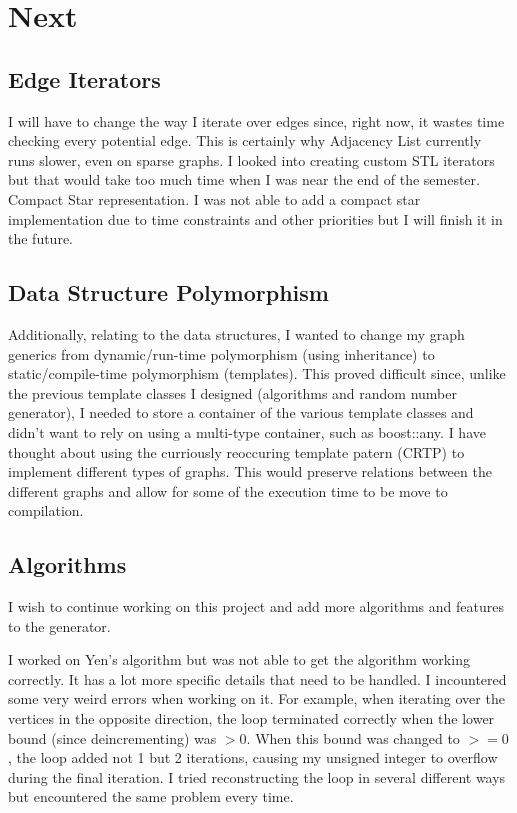 \documentclass{article}
\begin{document}
\section{Next}
\subsection{Edge Iterators}
I will have to change the way I iterate over edges since, right now, it wastes time checking every potential edge. This is certainly why Adjacency List currently runs slower, even on sparse graphs. I looked into creating custom STL iterators but that would take too much time when I was near the end of the semester. Compact Star representation. I was not able to add a compact star implementation due to time constraints and other priorities but I will finish it in the future. 

\subsection{Data Structure Polymorphism}
Additionally, relating to the data structures, I wanted to change my graph generics from dynamic/run-time polymorphism (using inheritance) to static/compile-time polymorphism (templates). This proved difficult since, unlike the previous template classes I designed (algorithms and random number generator), I needed to store a container of the various template classes and didn't want to rely on using a multi-type container, such as boost::any. 
I have thought about using the curriously reoccuring template patern (CRTP) to implement different types of graphs. This would preserve relations between the different graphs and allow for some of the execution time to be move to compilation.

\subsection{Algorithms}
I wish to continue working on this project and add more algorithms and features to the generator. 

I worked on Yen's algorithm but was not able to get the algorithm working correctly. It has a lot more specific details that need to be handled. I incountered some very weird errors when working on it. For example, when iterating over the vertices in the opposite direction, the loop terminated correctly when the lower bound (since deincrementing) was $>0$. When this bound was changed to $>=0$, the loop added not 1 but 2 iterations, causing my unsigned integer to overflow during the final iteration. I tried reconstructing the loop in several different ways but encountered the same problem every time.
\end{document}
